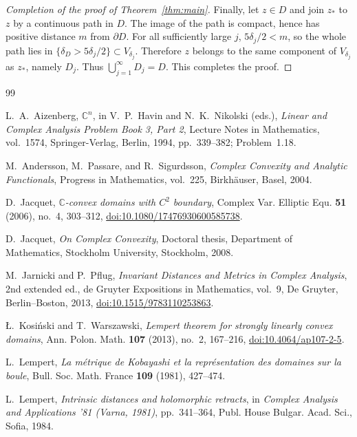\documentclass[12pt]{amsart}
\begin{document}
\begin{proof}[Completion of the proof of Theorem~\ref{thm:main}]
Finally, let $z\in D$ and join $z_*$ to $z$ by a continuous path in $D$.
The image of the path is compact, hence has positive distance $m$ from
$\partial D$. For all sufficiently large $j$, $5\delta_j/2<m$, so the
whole path lies in
$\{\delta_D>5\delta_j/2\}\subset V_{\delta_j}$. Therefore $z$ belongs to
the same component of $V_{\delta_j}$ as $z_*$, namely $D_j$. Thus $\bigcup_{j=1}^\infty D_j=D$.
This completes the proof.
\end{proof}

\begin{thebibliography}{99}

L.~A.~Aizenberg,
\emph{$\mathbb C^n$},
in V.~P.~Havin and N.~K.~Nikolski (eds.),
\emph{Linear and Complex Analysis Problem Book 3, Part 2},
Lecture Notes in Mathematics, vol.~1574,
Springer-Verlag, Berlin, 1994, pp.~339--382; Problem~1.18.

M.~Andersson, M.~Passare, and R.~Sigurdsson,
\emph{Complex Convexity and Analytic Functionals},
Progress in Mathematics, vol.~225,
Birkh\"auser, Basel, 2004.

D.~Jacquet,
\emph{$\mathbb C$-convex domains with $C^2$ boundary},
Complex Var. Elliptic Equ. \textbf{51} (2006), no.~4, 303--312,
\href{https://doi.org/10.1080/17476930600585738}{doi:10.1080/17476930600585738}.

D.~Jacquet,
\emph{On Complex Convexity},
Doctoral thesis, Department of Mathematics, Stockholm University, Stockholm, 2008.

M.~Jarnicki and P.~Pflug,
\emph{Invariant Distances and Metrics in Complex Analysis},
2nd extended ed., de Gruyter Expositions in Mathematics, vol.~9,
De Gruyter, Berlin--Boston, 2013,
\href{https://doi.org/10.1515/9783110253863}{doi:10.1515/9783110253863}.

\L.~Kosi\'nski and T.~Warszawski,
\emph{Lempert theorem for strongly linearly convex domains},
Ann. Polon. Math. \textbf{107} (2013), no.~2, 167--216,
\href{https://doi.org/10.4064/ap107-2-5}{doi:10.4064/ap107-2-5}.

L.~Lempert,
\emph{La m\'etrique de Kobayashi et la repr\'esentation des domaines sur la boule},
Bull. Soc. Math. France \textbf{109} (1981), 427--474.

L.~Lempert,
\emph{Intrinsic distances and holomorphic retracts},
in \emph{Complex Analysis and Applications '81 (Varna, 1981)},
pp.~341--364, Publ. House Bulgar. Acad. Sci., Sofia, 1984.


\end{thebibliography}
\end{document}
